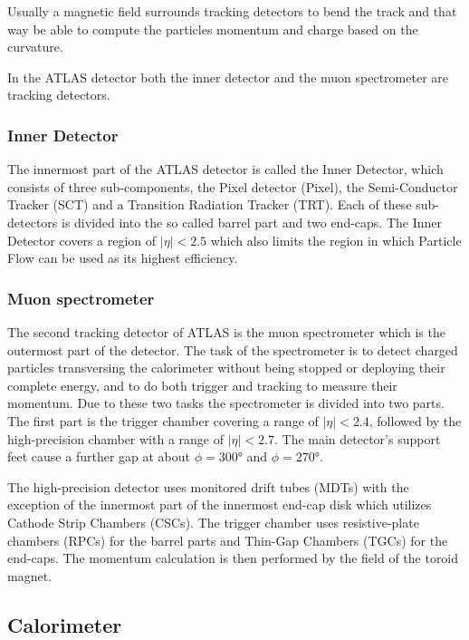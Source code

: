 Usually a magnetic field surrounds tracking detectors to bend the track and that way be able to compute the particles momentum and charge based on the curvature.


In the ATLAS detector both the inner detector and the muon spectrometer are tracking detectors.

\subsubsection{Inner Detector}

The innermost part of the ATLAS detector is called the Inner Detector, which consists of three sub-components, the Pixel detector (Pixel), the Semi-Conductor Tracker (SCT) and a Transition Radiation Tracker (TRT). Each of these sub-detectors is divided into the so called barrel part and two end-caps. The Inner Detector covers a region of $|\eta| < \num{2.5}$ which also limits the region in which Particle Flow can be used as its highest efficiency.

\subsubsection{Muon spectrometer}

The second tracking detector of ATLAS is the muon spectrometer which is the outermost part of the detector. The task of the spectrometer is to detect charged particles transversing the calorimeter without being stopped or deploying their complete energy, and to do both trigger and tracking to measure their momentum. Due to these two tasks the spectrometer is divided into two parts. The first part is the trigger chamber covering a range of $|\eta|<2.4$, followed by the high-precision chamber with a range of $|\eta|<2.7$. The main detector's support feet cause a further gap at about $\phi = \ang{300}$ and $\phi = \ang{270}$. 

The high-precision detector uses monitored drift tubes (MDTs) with the exception of the innermost part of the innermost end-cap disk which utilizes Cathode Strip Chambers (CSCs). The trigger chamber uses resistive-plate chambers (RPCs) for the barrel parts and Thin-Gap Chambers (TGCs) for the end-caps. The momentum calculation is then performed by the field of the toroid magnet.



\subsection{Calorimeter}


